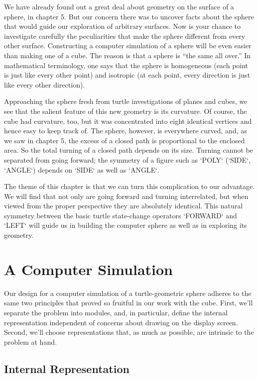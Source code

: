 \documentclass{book}
\begin{document}
We have already found out a great deal about geometry on the surface
of a sphere, in chapter 5. But our concern there was to uncover facts
about the sphere that would guide our exploration of arbitrary surfaces.
Now is your chance to investigate carefully the peculiarities that make
the sphere different from every other surface. Constructing a computer
simulation of a sphere will be even easier than making one of a cube.
The reason is that a sphere is ``the same all over.'' In mathematical
terminology, one says that the sphere is homogeneous (each point is
just like every other point) and isotropic (at each point, every direction
is just like every other direction).

Approaching the sphere fresh from turtle investigations of planes and
cubes, we see that the salient feature of this new geometry is its curvature. Of course, the cube had curvature, too, but it was concentrated
into eight identical vertices and hence easy to keep track of. The sphere,
however, is everywhere curved, and, as we saw in chapter 5, the excess
of a closed path is proportional to the enclosed area. So the total turning of a closed path depends on its size. Turning cannot be separated
from going forward; the symmetry of a figure such as \textsc{`POLY`} (\textsc{`SIDE`}, \textsc{`ANGLE`})
depends on \textsc{`SIDE`} as well as \textsc{`ANGLE`}.

The theme of this chapter is that we can turn this complication to our
advantage. We will find that not only are going forward and turning
interrelated, but when viewed from the proper perspective they are
absolutely identical. This natural symmetry between the basic turtle
state-change operators \textsc{`FORWARD`} and \textsc{`LEFT`} will guide us in building the
computer sphere as well as in exploring its geometry.

\section{A Computer Simulation}

Our design for a computer simulation of a turtle-geometric sphere adheres to the same two principles that proved so fruitful in our work with
the cube. First, we'll separate the problem into modules, and, in particular, define the internal representation independent of concerns about
drawing on the display screen. Second, we'll choose representations that,
as much as possible, are intrinsic to the problem at hand.

\subsection{Internal Representation}
\end{document}
